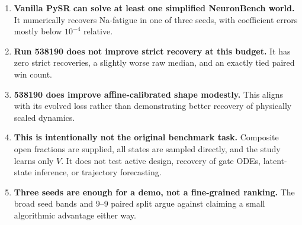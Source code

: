 \documentclass[10pt]{article}
\begin{document}
\begin{enumerate}[leftmargin=1.6em,itemsep=0.35em]
\item \textbf{Vanilla PySR can solve at least one simplified NeuronBench world.} It numerically
recovers Na-fatigue in one of three seeds, with coefficient errors mostly below $10^{-4}$ relative.
\item \textbf{Run 538190 does not improve strict recovery at this budget.} It has zero strict
recoveries, a slightly worse raw median, and an exactly tied paired win count.
\item \textbf{538190 does improve affine-calibrated shape modestly.} This aligns with its evolved
loss rather than demonstrating better recovery of physically scaled dynamics.
\item \textbf{This is intentionally not the original benchmark task.} Composite open fractions
are supplied, all states are sampled directly, and the study learns only $\dot V$. It does not test
active design, recovery of gate ODEs, latent-state inference, or trajectory forecasting.
\item \textbf{Three seeds are enough for a demo, not a fine-grained ranking.} The broad seed bands
and 9--9 paired split argue against claiming a small algorithmic advantage either way.
\end{enumerate}
\end{document}
